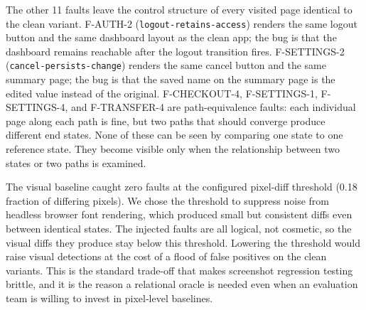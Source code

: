 \documentclass[sigconf,nonacm]{acmart}
\begin{document}
The other 11 faults leave the control structure of every visited page identical to the clean variant. F-AUTH-2 (\texttt{logout-retains-access}) renders the same logout button and the same dashboard layout as the clean app; the bug is that the dashboard remains reachable after the logout transition fires. F-SETTINGS-2 (\texttt{cancel-persists-change}) renders the same cancel button and the same summary page; the bug is that the saved name on the summary page is the edited value instead of the original. F-CHECKOUT-4, F-SETTINGS-1, F-SETTINGS-4, and F-TRANSFER-4 are path-equivalence faults: each individual page along each path is fine, but two paths that should converge produce different end states. None of these can be seen by comparing one state to one reference state. They become visible only when the relationship between two states or two paths is examined.

The visual baseline caught zero faults at the configured pixel-diff threshold (0.18 fraction of differing pixels). We chose the threshold to suppress noise from headless browser font rendering, which produced small but consistent diffs even between identical states. The injected faults are all logical, not cosmetic, so the visual diffs they produce stay below this threshold. Lowering the threshold would raise visual detections at the cost of a flood of false positives on the clean variants. This is the standard trade-off that makes screenshot regression testing brittle, and it is the reason a relational oracle is needed even when an evaluation team is willing to invest in pixel-level baselines.
\end{document}
